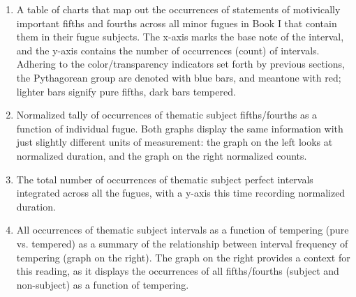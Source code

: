 \begin{enumerate}
\def\labelenumi{\arabic{enumi}.}
\tightlist
\item
  A table of charts that map out the occurrences of statements of
  motivically important fifths and fourths across all minor fugues in
  Book I that contain them in their fugue subjects. The x-axis marks the
  base note of the interval, and the y-axis contains the number of
  occurrences (count) of intervals. Adhering to the color/transparency
  indicators set forth by previous sections, the Pythagorean group are
  denoted with blue bars, and meantone with red; lighter bars signify
  pure fifths, dark bars tempered.
\item
  Normalized tally of occurrences of thematic subject fifths/fourths as
  a function of individual fugue. Both graphs display the same
  information with just slightly different units of measurement: the
  graph on the left looks at normalized duration, and the graph on the
  right normalized counts.
\item
  The total number of occurrences of thematic subject perfect intervals
  integrated across all the fugues, with a y-axis this time recording
  normalized duration.
\item
  All occurrences of thematic subject intervals as a function of
  tempering (pure vs. tempered) as a summary of the relationship between
  interval frequency of tempering (graph on the right). The graph on the
  right provides a context for this reading, as it displays the
  occurrences of all fifths/fourths (subject and non-subject) as a
  function of tempering.
\end{enumerate}


    \begin{center}
    \end{center}
    

    \begin{center}
    \end{center}
    


    \begin{center}
    \end{center}
    

    \begin{center}
    \end{center}
    
